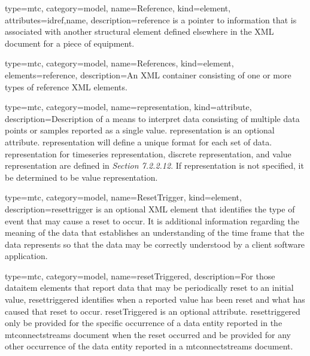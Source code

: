 {
  type=mtc,
  category=model,
  name={Reference},
  kind={element},
  attributes={\gls{idref},\gls{name}},
  description={\gls{reference} is a pointer to information that is associated with another \gls{structural element} defined elsewhere in the XML document for a piece of equipment.}
}


{
  type=mtc,
  category=model,
  name={References},
  kind={element},
  elements={\gls{reference}},
  description={An XML container consisting of one or more types of \gls{reference} XML elements.}
}


{
  type=mtc,
  category=model,
  name={representation},
  kind={attribute},
  description={Description of a means to interpret data consisting of multiple data points or samples reported as a single value.  \newline \gls{representation} is an optional attribute.  \newline \gls{representation} will define a unique format for each set of data.  \newline \gls{representation} for \gls{timeseries representation}, \gls{discrete representation}, and \gls{value representation} are defined in  \textit{Section 7.2.2.12}.  \newline If \gls{representation} is not specified, it \MUST be determined to be \gls{value representation}.}
}


{
  type=mtc,
  category=model,
  name={ResetTrigger},
  kind={element},
  description={\gls{resettrigger} is an optional XML element that identifies the type of event that may cause a reset to occur. It is additional information regarding the meaning of the data that establishes an understanding of the time frame that the data represents so that the data may be correctly understood by a client software application.}
}


{
  type=mtc,
  category=model,
  name={resetTriggered},
  description={For those \gls{dataitem} elements that report data that may be periodically reset to an initial value, \gls{resettriggered} identifies when a reported value has been reset and what has caused that reset to occur.  \newline resetTriggered is an optional attribute.  \newline \gls{resettriggered} \MUST only be provided for the specific occurrence of a \gls{data entity} reported in the \glspl{mtconnectstream} document when the reset occurred and \MUSTNOT be provided for any other occurrence of the \gls{data entity} reported in a \glspl{mtconnectstream} document.}
}


